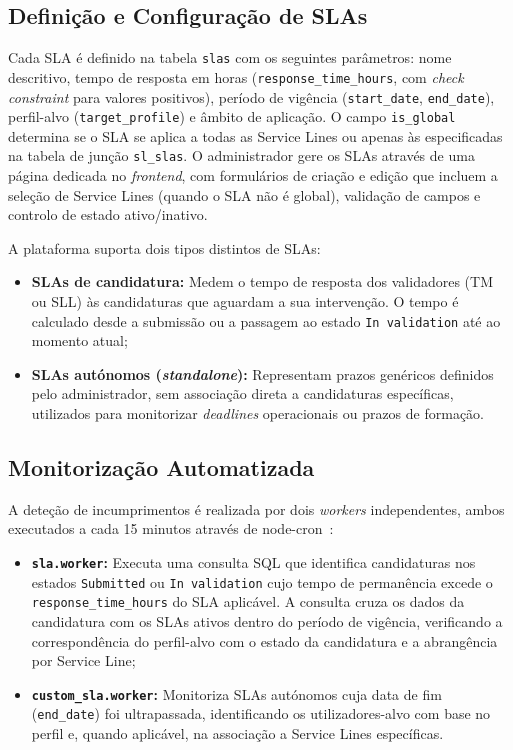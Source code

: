 \documentclass[12pt,a4paper]{report}
\begin{document}
\subsection{Definição e Configuração de SLAs}

Cada SLA é definido na tabela \texttt{slas} com os seguintes parâmetros: nome descritivo, tempo de resposta em horas (\texttt{response\_time\_hours}, com \textit{check constraint} para valores positivos), período de vigência (\texttt{start\_date}, \texttt{end\_date}), perfil-alvo (\texttt{target\_profile}) e âmbito de aplicação. O campo \texttt{is\_global} determina se o SLA se aplica a todas as Service Lines ou apenas às especificadas na tabela de junção \texttt{sl\_slas}. O administrador gere os SLAs através de uma página dedicada no \textit{frontend}, com formulários de criação e edição que incluem a seleção de Service Lines (quando o SLA não é global), validação de campos e controlo de estado ativo/inativo.

A plataforma suporta dois tipos distintos de SLAs:

\begin{itemize}
  \item \textbf{SLAs de candidatura:} Medem o tempo de resposta dos validadores (TM ou SLL) às candidaturas que aguardam a sua intervenção. O tempo é calculado desde a submissão ou a passagem ao estado \texttt{In validation} até ao momento atual;
  \item \textbf{SLAs autónomos (\textit{standalone}):} Representam prazos genéricos definidos pelo administrador, sem associação direta a candidaturas específicas, utilizados para monitorizar \textit{deadlines} operacionais ou prazos de formação.
\end{itemize}

\subsection{Monitorização Automatizada}

A deteção de incumprimentos é realizada por dois \textit{workers} independentes, ambos executados a cada 15 minutos através de node-cron~\cite{nodecron}:

\begin{itemize}
  \item \textbf{\texttt{sla.worker}:} Executa uma consulta SQL que identifica candidaturas nos estados \texttt{Submitted} ou \texttt{In validation} cujo tempo de permanência excede o \texttt{response\_\allowbreak time\_\allowbreak hours} do SLA aplicável. A consulta cruza os dados da candidatura com os SLAs ativos dentro do período de vigência, verificando a correspondência do perfil-alvo com o estado da candidatura e a abrangência por Service Line;
  \item \textbf{\texttt{custom\_sla.worker}:} Monitoriza SLAs autónomos cuja data de fim (\texttt{end\_date}) foi ultrapassada, identificando os utilizadores-alvo com base no perfil e, quando aplicável, na associação a Service Lines específicas.
\end{itemize}
\end{document}
